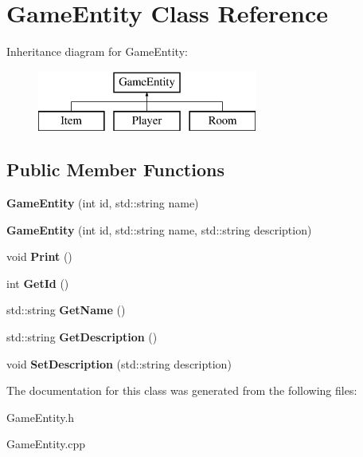 \hypertarget{class_game_entity}{}\section{Game\+Entity Class Reference}
\label{class_game_entity}
Inheritance diagram for Game\+Entity\+:\begin{figure}[H]
\begin{center}
\leavevmode
\includegraphics[height=2.000000cm]{class_game_entity}
\end{center}
\end{figure}
\subsection*{Public Member Functions}
\begin{DoxyCompactItemize}
\item 
\hypertarget{class_game_entity_ac534073fe3e7b25d95029c8af622a88e}{}{\bfseries Game\+Entity} (int id, std\+::string name)\label{class_game_entity_ac534073fe3e7b25d95029c8af622a88e}

\item 
\hypertarget{class_game_entity_a941b5c3c653f7526545bd81816e9531a}{}{\bfseries Game\+Entity} (int id, std\+::string name, std\+::string description)\label{class_game_entity_a941b5c3c653f7526545bd81816e9531a}

\item 
\hypertarget{class_game_entity_ac909a518389ee9bc92562b4166340766}{}void {\bfseries Print} ()\label{class_game_entity_ac909a518389ee9bc92562b4166340766}

\item 
\hypertarget{class_game_entity_ad20b660a4f851e9636fdfd15f0d44df0}{}int {\bfseries Get\+Id} ()\label{class_game_entity_ad20b660a4f851e9636fdfd15f0d44df0}

\item 
\hypertarget{class_game_entity_ae45ee64de484dec1b16aea85171d9856}{}std\+::string {\bfseries Get\+Name} ()\label{class_game_entity_ae45ee64de484dec1b16aea85171d9856}

\item 
\hypertarget{class_game_entity_ac8da446a6c6990585b6581fe8537b7bf}{}std\+::string {\bfseries Get\+Description} ()\label{class_game_entity_ac8da446a6c6990585b6581fe8537b7bf}

\item 
\hypertarget{class_game_entity_a163f5785614921a65aab161491d8c47c}{}void {\bfseries Set\+Description} (std\+::string description)\label{class_game_entity_a163f5785614921a65aab161491d8c47c}

\end{DoxyCompactItemize}


The documentation for this class was generated from the following files\+:\begin{DoxyCompactItemize}
\item 
Game\+Entity.\+h\item 
Game\+Entity.\+cpp\end{DoxyCompactItemize}
